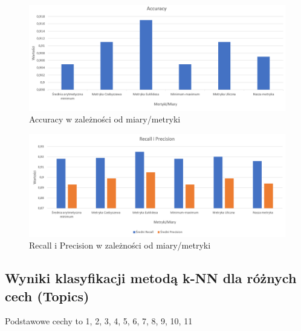 \documentclass{classrep}
\begin{document}
{\begin{figure}[H]
\caption{Accuracy w zależności od miary/metryki}
\centering
\includegraphics[width=1\textwidth]{i9}
\end{figure}

\begin{figure}[H]
\caption{Recall i Precision w zależności od miary/metryki}
\centering
\includegraphics[width=1\textwidth]{i10}
\end{figure}

\subsection{Wyniki klasyfikacji metodą k-NN dla różnych cech (Topics)}

Podstawowe cechy to 1, 2, 3, 4, 5, 6, 7, 8, 9, 10, 11

}
\end{document}
